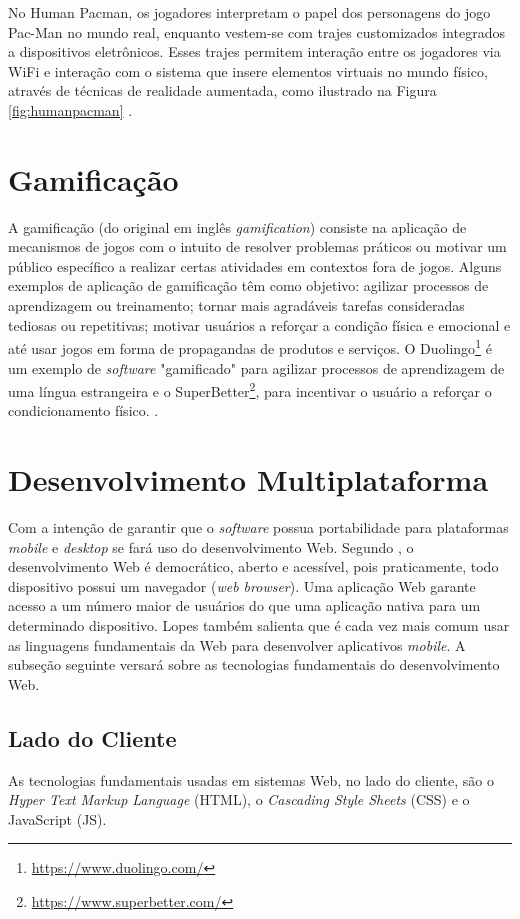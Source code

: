 No Human Pacman, os jogadores interpretam o papel dos personagens do jogo Pac-Man no mundo real, enquanto vestem-se com trajes customizados integrados a dispositivos eletrônicos. Esses trajes permitem interação entre os jogadores via WiFi e interação com o sistema que insere elementos virtuais no mundo físico, através de técnicas de realidade aumentada, como ilustrado na Figura \ref{fig:humanpacman} \cite{cheok2003}. 

\section{Gamificação}
A gamificação (do original em inglês \textit{gamification}) consiste na aplicação de mecanismos de jogos com o intuito de resolver problemas práticos ou motivar um público específico a realizar certas atividades em contextos fora de jogos. Alguns exemplos de aplicação de gamificação têm como objetivo: agilizar processos de aprendizagem ou treinamento; tornar mais agradáveis tarefas consideradas tediosas ou repetitivas; motivar usuários a reforçar a condição física e emocional e até usar jogos em forma de propagandas de produtos e serviços. O Duolingo\footnote{\url{https://www.duolingo.com/}} é um exemplo de \textit{software} "gamificado" para agilizar processos de aprendizagem de uma língua estrangeira e o SuperBetter\footnote{\url{https://www.superbetter.com/}}, para incentivar o usuário a reforçar o condicionamento físico. \cite{vianna2013, zichermann2011}.

\section{Desenvolvimento Multiplataforma}
Com a intenção de garantir que o \textit{software} possua portabilidade para plataformas \textit{mobile} e \textit{desktop} se fará uso do desenvolvimento Web. Segundo \citet{lopes2013}, o desenvolvimento Web é democrático, aberto e acessível, pois praticamente, todo dispositivo possui um navegador (\textit{web browser}). Uma aplicação Web garante acesso a um número maior de usuários do que uma aplicação nativa para um determinado dispositivo. Lopes também salienta que é cada vez mais comum usar as linguagens fundamentais da Web para desenvolver aplicativos \textit{mobile}. A subseção seguinte versará sobre as tecnologias fundamentais do desenvolvimento Web.

\subsection{Lado do Cliente}
As tecnologias fundamentais usadas em sistemas Web, no lado do cliente, são o \textit{Hyper Text Markup Language} (HTML), o \textit{Cascading Style Sheets} (CSS) e o JavaScript (JS). \par

